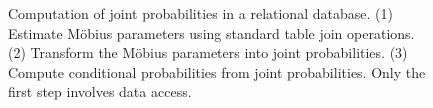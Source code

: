 \documentclass[oribibl]{llncs}
\begin{document}
\begin{figure}[t]
\begin{center}
\caption{Computation of joint probabilities in a relational database. (1) Estimate M\"obius parameters using standard table join operations. (2) Transform the M\"obius parameters into joint probabilities. (3) Compute conditional probabilities from joint probabilities.
Only the first step involves data access.
\label{fig:flow}}
\end{center}
\end{figure}

%
%
%
%
%
\end{document}
